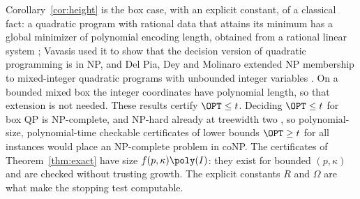 \begin{remark}\label{rem:np}
Corollary~\ref{cor:height} is the box case, with an explicit constant, of a
classical fact: a quadratic program with rational data that attains its
minimum has a global minimizer of polynomial encoding length, obtained from
a rational linear system \cite{Vavasis1990}; Vavasis used it to show that the
decision version of quadratic programming is in NP, and Del Pia, Dey and
Molinaro extended NP membership to mixed-integer quadratic programs with
unbounded integer variables \cite{DelPiaDeyMolinaro2017}. On a bounded
mixed box the integer coordinates have polynomial length, so that extension
is not needed. These results certify $\OPT\le t$. Deciding $\OPT\le t$ for
box QP is NP-complete, and NP-hard already at treewidth two
\cite{DelPiaKhajavirad2026}, so polynomial-size, polynomial-time checkable
certificates of lower bounds $\OPT\ge t$ for all instances would place an
NP-complete problem in coNP. The
certificates of Theorem~\ref{thm:exact} have size $f(p,\kappa)\poly(I)$:
they exist for bounded $(p,\kappa)$ and are checked without trusting
growth. The explicit constants $R$ and $\Omega$ are what make the stopping test
computable.
\end{remark}

